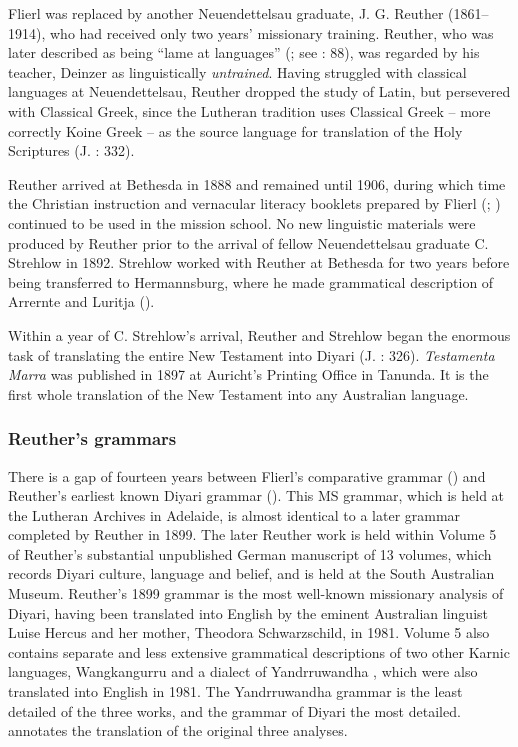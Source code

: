 Flierl was replaced by another Neuendettelsau graduate, J. G. Reuther (1861--1914), who had received only two years' missionary training. Reuther, who was later described as being “lame at languages” (; see \citealt{kenny_arandas_2013}: 88), was regarded by his teacher, Deinzer as linguistically \textit{untrained}. Having struggled with classical languages at Neuendettelsau, Reuther dropped the study of Latin, but persevered with Classical Greek, since the Lutheran tradition uses Classical Greek – more correctly Koine Greek – as the source language for translation of the Holy Scriptures (J. \citealt{strehlow_tale_2011}: 332).

Reuther arrived at Bethesda in 1888 and remained until 1906, during which time the Christian instruction and vernacular literacy booklets prepared by Flierl (\citeyear{flierl_dieri_1880}; \citeyear{flierl_wonini-pepa_1883}) continued to be used in the mission school. No new linguistic materials were produced by Reuther prior to the arrival of fellow Neuendettelsau graduate C. Strehlow in 1892. Strehlow worked with Reuther at Bethesda for two years before being transferred to Hermannsburg, where he made grammatical description of Arrernte and Luritja ().

Within a year of C. Strehlow’s arrival, Reuther and Strehlow began the enormous task of translating the entire New Testament into Diyari (J. \citealt{strehlow_tale_2011}: 326). \textit{Testamenta Marra} was published in 1897 at Auricht’s Printing Office in Tanunda. It is the first whole translation of the New Testament into any Australian language.

\subsubsection{Reuther’s grammars}
\label{sec:key:8.4.2.1}\label{bkm:Ref456262601}

There is a gap of fourteen years between Flierl’s comparative grammar (\citeyear{flierl_dieri_1880}) and Reuther’s earliest known Diyari grammar (\citeyear{reuther_dieri_1894}). This MS grammar, which is held at the Lutheran Archives in Adelaide, is almost identical to a later grammar completed by Reuther in 1899. The later Reuther work is held within Volume 5 of Reuther’s substantial unpublished German manuscript of 13 volumes, which records Diyari culture, language and belief, and is held at the South Australian Museum. Reuther’s 1899 grammar is the most well-known missionary analysis of Diyari, having been translated into English by the eminent Australian linguist Luise Hercus and her mother, Theodora Schwarzschild, in 1981. Volume 5 also contains separate and less extensive grammatical descriptions of two other Karnic languages, Wangkangurru and a dialect of Yandrruwandha \citep[73--74]{austin_notitle_1981}, which were also translated into English in 1981. The Yandrruwandha grammar is the least detailed of the three works, and the grammar of Diyari the most detailed. \citet{austin_notitle_1981} annotates the translation of the original three analyses.

